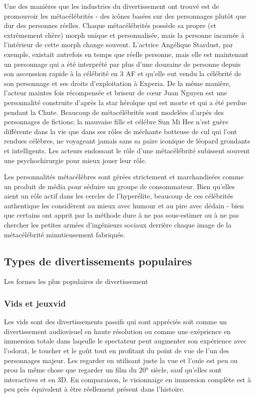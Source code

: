                Une des manières que les industries du divertissement ont trouvé est de promouvoir les métacélébrités - des icônes basées sur des personnages plutôt que dur des personnes réelles. Chaque métacélébrités possède sa propre (et extrêmement chère) morph unique et personnalisée, mais la personne incarnée à l'intérieur de cette morph change souvent. L'actrice Angélique Stardust, par exemple, existait autrefois en temps que réelle personne, mais elle est maintenant un personnage qui a été interprété par plus d'une douzaine de personne depuis son ascenssion rapide à la célébrité en 3 AF et qu'elle eut vendu la célébrité de son personnage et ses droits d'exploitation à Experia. De la même manière, l'acteur maintes fois récompensée et briseur de cœur Juan Nguyen est une personnalité construite d'après la star héroîque qui est morte et qui a été perdue pendant la Chute. Beaucoup de métacélébrités sont modelées d'arpès des personnages de fictions; la mauvaise fille et célébre Sun Mi Hee n'est guère différente dans la vie que dans ses rôles de méchante botteuse de cul qui l'ont rendues célèbres, ne voyageant jamais sans sa paire iconique de léopard grondants et intelligents. Les acteurs endossant le rôle d'une métacélébrité subissent souvent une psychochirurgie pour mieux jouer leur rôle. 

               Les personnalités métacélèbres sont gérées strictement et marchandisées comme un produit de média pour séduire un groupe de consommateur. Bien qu'elles aient un rôle actif dans les cercles de l'hyperélite, beaucoup de ces célébrités authentique les considèrent au mieux avec humour et au pire avec dédain - bien que certains ont apprit par la méthode dure à ne pas sous-estimer ou à ne pas chercher les petites armées d'ingénieurs sociaux derrière chaque image de la métacélébrité minutieusement fabriquée. 

               \subsection{Types de divertissements populaires} \label{sec:popul-types-entert} 

               Les formes les plus populaires de divertissement  

               \subsubsection{Vids et jeuxvid} \label{sec:vids-vidgames} 

               Les vids sont des divertissements passifs qui sont appréciés soit comme un divertissement audiovisuel en haute résolution ou comme une exéprience en immersion totale dans laqeulle le spectateur peut augmenter son expérience avec l'odorat, le toucher et le goût tout en profitant du point de vue de l'un des personnages majeur. Les regarder en utilisant juste la vue et l'ouïe est peu ou prou la même chose que regarder un film du 20° siècle, sauf qu'elles sont interactives et en 3D. En comparaison, le visionnaige en immersion complète est à peu près équivalent à être réellement présent dans l'histoire. 

